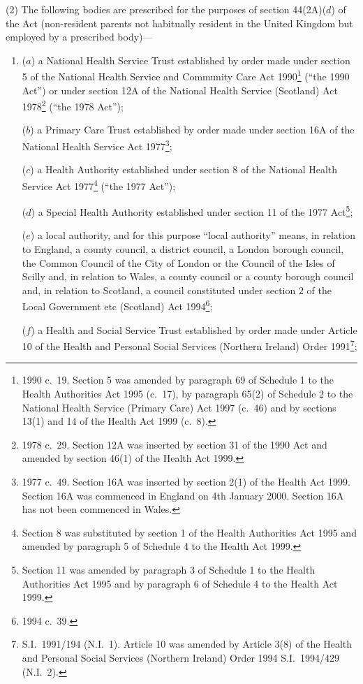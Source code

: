 \documentclass[12pt,a4paper]{article}
\begin{document}
(2) The following bodies are prescribed for the purposes of section 44(2A)($d$)  of the Act (non-resident parents not habitually resident in the United Kingdom but employed by a prescribed body)—
\begin{enumerate}\item[]
($a$) a National Health Service Trust established by order made under section 5 of the National Health Service and Community Care Act 1990\footnote{1990 c.\ 19. Section 5 was amended by paragraph 69 of Schedule 1 to the Health Authorities Act 1995 (c.\ 17), by paragraph 65(2) of Schedule 2 to the National Health Service (Primary Care) Act 1997 (c.\ 46) and by sections 13(1) and 14 of the Health Act 1999 (c.\ 8).} (“the 1990 Act”) or under section 12A of the National Health Service (Scotland) Act 1978\footnote{1978 c.\ 29. Section 12A was inserted by section 31 of the 1990 Act and amended by section 46(1) of the Health Act 1999.} (“the 1978 Act”);

($b$) a Primary Care Trust established by order made under section 16A of the National Health Service Act 1977\footnote{1977 c.\ 49. Section 16A was inserted by section 2(1) of the Health Act 1999. Section 16A was commenced in England on 4th January 2000. Section 16A has not been commenced in Wales.};

($c$) a Health Authority established under section 8 of the National Health Service Act 1977\footnote{Section 8 was substituted by section 1 of the Health Authorities Act 1995 and amended by paragraph 5 of Schedule 4 to the Health Act 1999.} (“the 1977 Act”);

($d$) a Special Health Authority established under section 11 of the 1977 Act\footnote{Section 11 was amended by paragraph 3 of Schedule 1 to the Health Authorities Act 1995 and by paragraph 6 of Schedule 4 to the Health Act 1999.};

($e$) a local authority, and for this purpose “local authority” means, in relation to England, a county council, a district council, a London borough council, the Common Council of the City of London or the Council of the Isles of Scilly and, in relation to Wales, a county council or a county borough council and, in relation to Scotland, a council constituted under section 2 of the Local Government etc (Scotland) Act 1994\footnote{1994 c.\ 39.};

($f$) a Health and Social Service Trust established by order made under Article 10 of the Health and Personal Social Services (Northern Ireland) Order 1991\footnote{S.I.\ 1991/194 (N.I.~1). Article 10 was amended by Article 3(8) of the Health and Personal Social Services (Northern Ireland) Order 1994 S.I.\ 1994/429 (N.I.~2).};


\end{enumerate}
\end{document}
